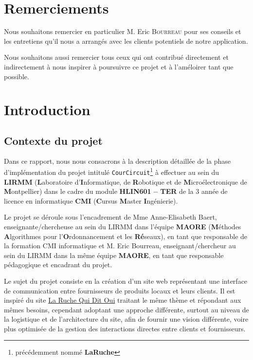 \documentclass[a4paper,12pt]{report}
\theoremstyle{break}
\theoremstyle{break}
\theoremstyle{break}
\theoremstyle{break}
\theoremstyle{definition}
\theoremstyle{remark}
\begin{document}
\chapter*{Remerciements}
Nous souhaitons remercier en particulier M. Eric \textsc{Bourreau} pour ses conseils et les entretiens qu'il nous a arrangés avec les clients potentiels de notre application.

Nous souhaitons aussi remercier tous ceux qui ont contribué directement et indirectement à nous inspirer à poursuivre ce projet et à l'améloirer tant que possible.
\chapter{Introduction}
\setcounter{page}{1}
\section{Contexte du projet}
Dans ce rapport, nous nous consacrons à la description détaillée de la phase d'implémentation du projet intitulé \texttt{CourCircuit}\footnote{précédemment nommé \textbf{LaRuche}} à effectuer au sein du \textbf{LIRMM} (\textbf{L}aboratoire d'\textbf{I}nformatique, de \textbf{R}obotique et de \textbf{M}icroélectronique de \textbf{M}ontpellier) dans le cadre du module \textbf{HLIN601 -- TER} de la $3$\ieme{} année de licence en informatique \textbf{CMI} (\textbf{C}ursus \textbf{M}aster \textbf{I}ngénierie).

Le projet se déroule sous l'encadrement de Mme Anne-Elisabeth Baert, enseignante/chercheuse au sein du LIRMM dans l'équipe \textbf{MAORE} (\textbf{M}éthodes \textbf{A}lgorithmes pour l'\textbf{O}rdonnancement et les \textbf{Ré}seaux), en tant que responsable de la formation CMI informatique et M. Eric Bourreau, enseignant/chercheur au sein du LIRMM dans la même équipe \textbf{MAORE}, en tant que responsable pédagogique et encadrant du projet.

Le sujet du projet consiste en la création d'un site web représentant une interface de communication entre fournisseurs de produits locaux et leurs clients. Il est inspiré du site \og \href{https://laruchequiditoui.fr/fr}{La Ruche Qui Dit Oui} \fg traitant le même thème et répondant aux mêmes besoins, cependant adoptant une approche différente, surtout au niveau de la logistique et de l'architecture du site, afin de fournir une vision différente, voire plus optimisée de la gestion des interactions directes entre clients et fournisseurs.
\end{document}

